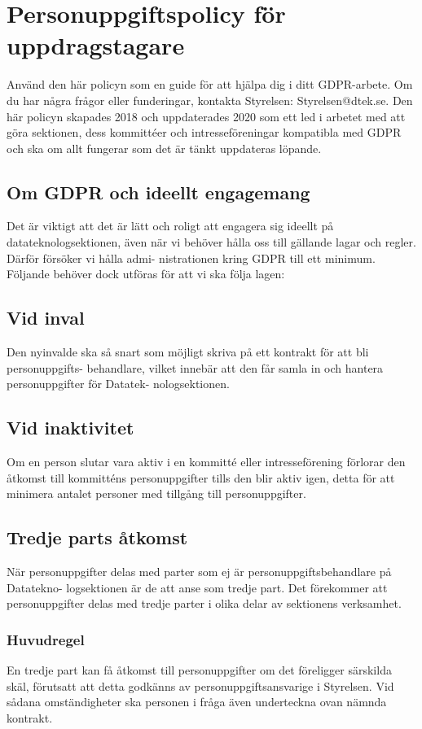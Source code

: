 \section{Personuppgiftspolicy för uppdragstagare}
Använd den här policyn som en guide för att hjälpa dig i ditt GDPR-arbete. Om du har
några frågor eller funderingar, kontakta Styrelsen: Styrelsen@dtek.se.
Den här policyn skapades 2018 och uppdaterades 2020 som ett led i arbetet med att göra
sektionen, dess kommittéer och intresseföreningar kompatibla med GDPR och ska om allt
fungerar som det är tänkt uppdateras löpande.

\subsection{Om GDPR och ideellt engagemang}
Det är viktigt att det är lätt och roligt att engagera sig ideellt på datateknologsektionen,
även när vi behöver hålla oss till gällande lagar och regler. Därför försöker vi hålla admi-
nistrationen kring GDPR till ett minimum. Följande behöver dock utföras för att vi ska
följa lagen:

\subsection{Vid inval}
Den nyinvalde ska så snart som möjligt skriva på ett kontrakt för att bli personuppgifts-
behandlare, vilket innebär att den får samla in och hantera personuppgifter för Datatek-
nologsektionen.

\subsection{Vid inaktivitet}
Om en person slutar vara aktiv i en kommitté eller intresseförening förlorar den åtkomst
till kommitténs personuppgifter tills den blir aktiv igen, detta för att minimera antalet
personer med tillgång till personuppgifter.

\subsection{Tredje parts åtkomst}
När personuppgifter delas med parter som ej är personuppgiftsbehandlare på Datatekno-
logsektionen är de att anse som tredje part. Det förekommer att personuppgifter delas med
tredje parter i olika delar av sektionens verksamhet.

\subsubsection{Huvudregel}
En tredje part kan få åtkomst till personuppgifter om det föreligger särskilda skäl, förutsatt
att detta godkänns av personuppgiftsansvarige i Styrelsen. Vid sådana omständigheter ska
personen i fråga även underteckna ovan nämnda kontrakt.

